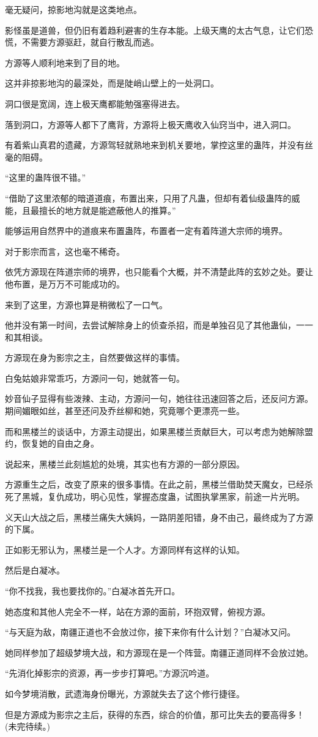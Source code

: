 \begin{this_body}
毫无疑问，掠影地沟就是这类地点。

影怪虽是道兽，但仍旧有着趋利避害的生存本能。上级天鹰的太古气息，让它们恐慌，不需要方源驱赶，就自行散乱而逃。

方源等人顺利地来到了目的地。

这并非掠影地沟的最深处，而是陡峭山壁上的一处洞口。

洞口很是宽阔，连上极天鹰都能勉强塞得进去。

落到洞口，方源等人都下了鹰背，方源将上极天鹰收入仙窍当中，进入洞口。

有着紫山真君的遗藏，方源驾轻就熟地来到机关要地，掌控这里的蛊阵，并没有丝毫的阻碍。

“这里的蛊阵很不错。”

“借助了这里浓郁的暗道道痕，布置出来，只用了凡蛊，但却有着仙级蛊阵的威能，且最擅长的地方就是能遮蔽他人的推算。”

能够运用自然界中的道痕来布置蛊阵，布置者一定有着阵道大宗师的境界。

对于影宗而言，这也毫不稀奇。

依凭方源现在阵道宗师的境界，也只能看个大概，并不清楚此阵的玄妙之处。要让他布置，是万万不可能成功的。

来到了这里，方源也算是稍微松了一口气。

他并没有第一时间，去尝试解除身上的侦查杀招，而是单独召见了其他蛊仙，一一和其相谈。

方源现在身为影宗之主，自然要做这样的事情。

白兔姑娘非常乖巧，方源问一句，她就答一句。

妙音仙子显得有些泼辣、主动，方源问一句，她往往迅速回答之后，还反问方源。期间媚眼如丝，甚至还问及乔丝柳和她，究竟哪个更漂亮一些。

而和黑楼兰的谈话中，方源主动提出，如果黑楼兰贡献巨大，可以考虑为她解除盟约，恢复她的自由之身。

说起来，黑楼兰此刻尴尬的处境，其实也有方源的一部分原因。

方源重生之后，改变了原来的很多事情。在此之前，黑楼兰借助焚天魔女，已经杀死了黑城，复仇成功，明心见性，掌握态度蛊，试图执掌黑家，前途一片光明。

义天山大战之后，黑楼兰痛失大姨妈，一路阴差阳错，身不由己，最终成为了方源的下属。

正如影无邪认为，黑楼兰是一个人才。方源同样有这样的认知。

然后是白凝冰。

“你不找我，我也要找你的。”白凝冰首先开口。

她态度和其他人完全不一样，站在方源的面前，环抱双臂，俯视方源。

“与天庭为敌，南疆正道也不会放过你，接下来你有什么计划？”白凝冰又问。

她同样参加了超级梦境大战，和方源现在是一个阵营。南疆正道同样不会放过她。

“先消化掉影宗的资源，再一步步打算吧。”方源沉吟道。

如今梦境消散，武遗海身份曝光，方源就失去了这个修行捷径。

但是方源成为影宗之主后，获得的东西，综合的价值，那可比失去的要高得多！(未完待续。)

\end{this_body}

